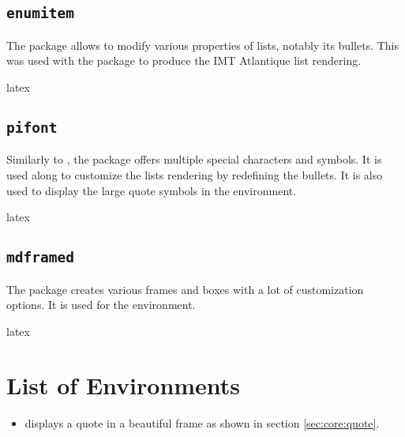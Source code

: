 \documentclass{report}
\begin{document}
\subsection{\texttt{enumitem}}
The  package allows to modify various properties of lists, notably its bullets. 
This was used with the  package to produce the IMT Atlantique list rendering.

\begin{imtaCode}{latex}
\RequirePackage{enumitem}
\end{imtaCode}


\subsection{\texttt{pifont}}
Similarly to , the  package offers multiple special characters and symbols. 
It is used along  to customize the lists rendering by redefining the bullets. 
It is also used to display the large quote symbols in the  environment.

\begin{imtaCode}{latex}
    \RequirePackage{pifont}
\end{imtaCode}


\subsection{\texttt{mdframed}}
The  package creates various frames and boxes with a lot of customization options. 
It is used for the  environment.

\begin{imtaCode}{latex}
    \RequirePackage{mdframed}
\end{imtaCode}



\section{List of Environments}
\begin{itemize}
    \item {} displays a quote in a beautiful frame as shown in section \ref{sec:core:quote}.
\end{itemize}


\end{document}
